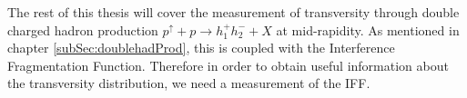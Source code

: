 \documentclass[abstract = on,listof=totoc, bibliography=totoc]{scrreprt}
\begin{document}
The rest of this thesis will cover the measurement of transversity through double charged hadron production $p^\uparrow + p \rightarrow h_1^+h_2^- + X$ at mid-rapidity. As mentioned in chapter \ref{subSec:doublehadProd}, this is coupled with the Interference Fragmentation Function. Therefore in order to obtain useful information about the transversity distribution, we need a measurement of the IFF. 

%
%
%
\end{document}
